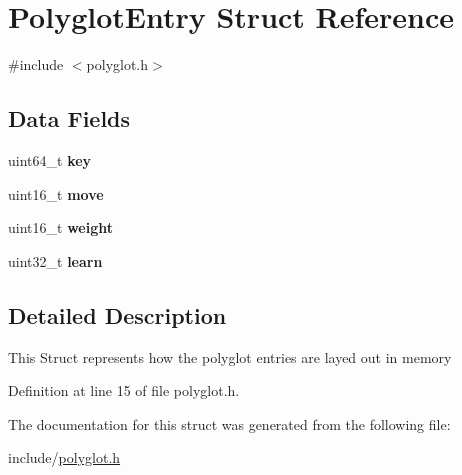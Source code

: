 \hypertarget{structPolyglotEntry}{}\section{Polyglot\+Entry Struct Reference}
\label{structPolyglotEntry}


{\ttfamily \#include $<$polyglot.\+h$>$}

\subsection*{Data Fields}
\begin{DoxyCompactItemize}
\item 
\mbox{\label{structPolyglotEntry_a12350fd6b30d536f5d8e74609a3abd58}} 
uint64\+\_\+t {\bfseries key}
\item 
\mbox{\label{structPolyglotEntry_a3d90c2490525d9c08b55256ebc866add}} 
uint16\+\_\+t {\bfseries move}
\item 
\mbox{\label{structPolyglotEntry_abcf293aaf15fdb22e5ce7fcccb58ba66}} 
uint16\+\_\+t {\bfseries weight}
\item 
\mbox{\label{structPolyglotEntry_a7fa0bafee890ac8d309a1d1daa15d962}} 
uint32\+\_\+t {\bfseries learn}
\end{DoxyCompactItemize}


\subsection{Detailed Description}
This Struct represents how the polyglot entries are layed out in memory 

Definition at line 15 of file polyglot.\+h.



The documentation for this struct was generated from the following file\+:\begin{DoxyCompactItemize}
\item 
include/\mbox{\hyperlink{polyglot_8h}{polyglot.\+h}}\end{DoxyCompactItemize}
